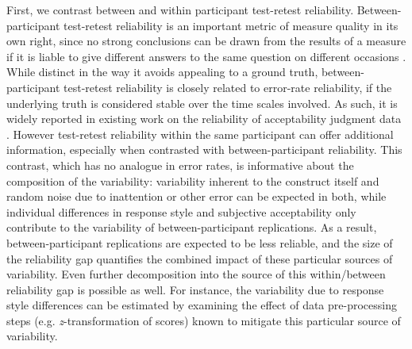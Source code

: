 \documentclass[doc]{apa6}
\begin{document}
First, we contrast between and within participant test-retest reliability. Between-participant test-retest reliability is an important metric of measure quality in its own right, since no strong conclusions can be drawn from the results of a measure if it is liable to give different answers to the same question on different occasions \citep{kline13, devellis2016scaledevelopmenttextbook, porte2013replicationstudies,brandt2014replicationisgood}. While distinct in the way it avoids appealing to a ground truth, between-participant test-retest reliability is closely related to error-rate reliability, if the underlying truth is considered stable over the time scales involved. As such, it is widely reported in existing work on the reliability of acceptability judgment data \citep{sprouse2013formalinformal,sprousealmeida2017sensitivitypower}. However test-retest reliability within the same participant can offer additional information, especially when contrasted with between-participant reliability. This contrast, which has no analogue in error rates, is informative about the composition of the variability: variability inherent to the construct itself and random noise due to inattention or other error can be expected in both, while individual differences in response style and subjective acceptability only contribute to the variability of between-participant replications. As a result, between-participant replications are expected to be less reliable, and the size of the reliability gap quantifies the combined impact of these particular sources of variability. Even further decomposition into the source of this within/between reliability gap is possible as well. For instance, the variability due to response style differences can be estimated by examining the effect of data pre-processing steps (e.g. \textit{z}-transformation of scores) known to mitigate this particular source of variability.
\end{document}
